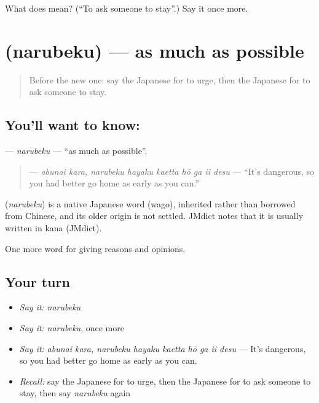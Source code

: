 \begin{tcolorbox}[breakable,colback=teal!4,colframe=teal!35!black,title={Before you move on}]
What does  mean? (\textquotedblleft{}To ask someone to stay\textquotedblright{}.) Say it once more.
\end{tcolorbox}
\section[\texorpdfstring{\ja{なるべく} (narubeku)}{なるべく (narubeku)}]{ (narubeku) — as much as possible}

\label{lesson:JA-C341-narubeku}



\begin{quote}
Before the new one: say the Japanese for to urge, then the Japanese for to ask someone to stay.
\end{quote}

\subsection*{You'll want to know: }
\textbf{} — \emph{narubeku} — \textquotedblleft{}as much as possible\textquotedblright{}.

\begin{quote}
\textbf{    } — \emph{abunai kara, narubeku hayaku kaetta hō ga ii desu} — \textquotedblleft{}It's dangerous, so you had better go home as early as you can.\textquotedblright{}
\end{quote}

\begin{cousinweb}
\textbf{} (\emph{narubeku}) is a native Japanese word (wago), inherited rather than borrowed from Chinese, and its older origin is not settled. JMdict notes that it is usually written in kana (JMdict).
\end{cousinweb}

\begin{grammarlens}[title={What you've built}]
One more word for giving reasons and opinions.
\end{grammarlens}

\subsection*{Your turn}
\begin{itemize}
\raggedright
  \item \emph{Say it:} \emph{narubeku}
  \item \emph{Say it:} \emph{narubeku}, once more
  \item \emph{Say it:} \emph{abunai kara, narubeku hayaku kaetta hō ga ii desu} — It's dangerous, so you had better go home as early as you can.
  \item \emph{Recall:} say the Japanese for to urge, then the Japanese for to ask someone to stay, then say \emph{narubeku} again
\end{itemize}


